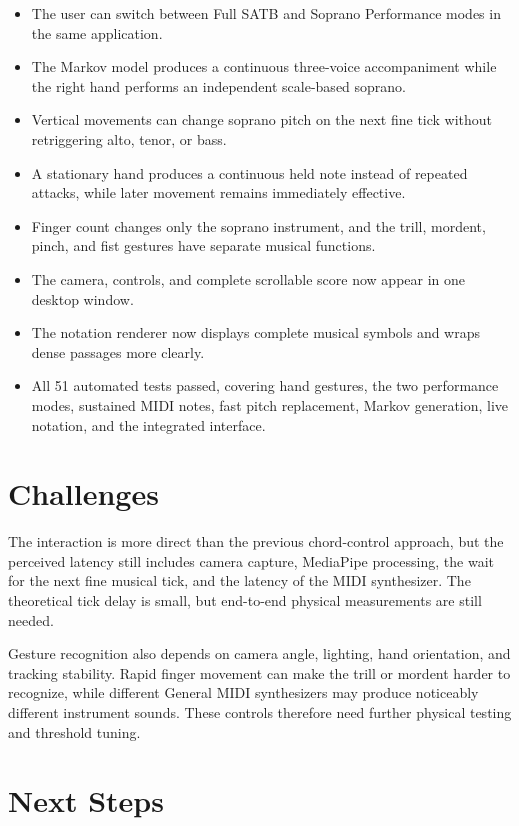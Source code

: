 \documentclass[11pt,a4paper]{article}
\begin{document}
\begin{itemize}
    \item The user can switch between Full SATB and Soprano Performance modes
    in the same application.
    \item The Markov model produces a continuous three-voice accompaniment
    while the right hand performs an independent scale-based soprano.
    \item Vertical movements can change soprano pitch on the next fine tick
    without retriggering alto, tenor, or bass.
    \item A stationary hand produces a continuous held note instead of repeated
    attacks, while later movement remains immediately effective.
    \item Finger count changes only the soprano instrument, and the trill,
    mordent, pinch, and fist gestures have separate musical functions.
    \item The camera, controls, and complete scrollable score now appear in one
    desktop window.
    \item The notation renderer now displays complete musical symbols and wraps
    dense passages more clearly.
    \item All 51 automated tests passed, covering hand gestures, the two
    performance modes, sustained MIDI notes, fast pitch replacement, Markov
    generation, live notation, and the integrated interface.
\end{itemize}

\section{Challenges}

The interaction is more direct than the previous chord-control approach, but
the perceived latency still includes camera capture, MediaPipe processing, the
wait for the next fine musical tick, and the latency of the MIDI synthesizer.
The theoretical tick delay is small, but end-to-end physical measurements are
still needed.

Gesture recognition also depends on camera angle, lighting, hand orientation,
and tracking stability. Rapid finger movement can make the trill or mordent
harder to recognize, while different General MIDI synthesizers may produce
noticeably different instrument sounds. These controls therefore need further
physical testing and threshold tuning.

\section{Next Steps}
\end{document}
